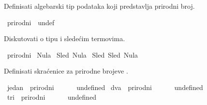 %
\begin{isabellebody}%
%
%
\isadelimtheory
%
\endisadelimtheory
%
\isatagtheory
%
\endisatagtheory
{\isafoldtheory}%
%
\isadelimtheory
%
\endisadelimtheory
%
\begin{exercise}[subtitle=Zasnivanje prirodnih brojeva.]
%
\begin{isamarkuptext}%
Definisati algebarski tip podataka  koji predstavlja prirodni broj.%
\end{isamarkuptext}\isamarkuptrue%
\isamarkupfalse%
\ prirodni\ {\isacharequal}{\kern0pt}\ undef%
\begin{isamarkuptext}%
Diskutovati o tipu  i sledećim termovima.%
\end{isamarkuptext}\isamarkuptrue%
\isamarkupfalse%
\ prirodni\isanewline
\isanewline
{}\isamarkupfalse%
\ {\isachardoublequoteopen}Nula{\isachardoublequoteclose}\isanewline
{}\isamarkupfalse%
\ {\isachardoublequoteopen}Sled\ Nula{\isachardoublequoteclose}\isanewline
{}\isamarkupfalse%
\ {\isachardoublequoteopen}Sled\ {\isacharparenleft}{\kern0pt}Sled\ Nula{\isacharparenright}{\kern0pt}{\isachardoublequoteclose}%
\begin{isamarkuptext}%
Definisati skraćenice za prirodne brojeve \isa{{\isasymone}{\isacharcomma}{\kern0pt}\ {\isasymtwo}{\isacharcomma}{\kern0pt}\ {\isasymthree}}.%
\end{isamarkuptext}\isamarkuptrue%
\isamarkupfalse%
\ jedan\ {\isacharcolon}{\kern0pt}{\isacharcolon}{\kern0pt}\ prirodni\ {\isacharparenleft}{\kern0pt}{\isachardoublequoteopen}{\isasymone}{\isachardoublequoteclose}{\isacharparenright}{\kern0pt}\ \isanewline
\ \ {\isachardoublequoteopen}{\isasymone}\ {\isasymequiv}\ undefined{\isachardoublequoteclose}\isanewline
\isanewline
{}\isamarkupfalse%
\ dva\ {\isacharcolon}{\kern0pt}{\isacharcolon}{\kern0pt}\ prirodni\ {\isacharparenleft}{\kern0pt}{\isachardoublequoteopen}{\isasymtwo}{\isachardoublequoteclose}{\isacharparenright}{\kern0pt}\ \isanewline
\ \ {\isachardoublequoteopen}{\isasymtwo}\ {\isasymequiv}\ undefined{\isachardoublequoteclose}\isanewline
\isanewline
{}\isamarkupfalse%
\ tri\ {\isacharcolon}{\kern0pt}{\isacharcolon}{\kern0pt}\ prirodni\ {\isacharparenleft}{\kern0pt}{\isachardoublequoteopen}{\isasymthree}{\isachardoublequoteclose}{\isacharparenright}{\kern0pt}\ \isanewline
\ \ {\isachardoublequoteopen}{\isasymthree}\ {\isasymequiv}\ undefined{\isachardoublequoteclose}%

\end{exercise}
\end{isabellebody}
